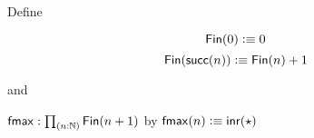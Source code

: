 \documentclass[12pt]{book}
\begin{document}
Define

$$\mathsf{Fin}(0) \vcentcolon\equiv 0$$
$$\mathsf{Fin}(\mathsf{succ}(n)) \vcentcolon\equiv \mathsf{Fin}(n) + 1$$

and

$\fmax : \prd{n:\nat} \Fin(n+1)$ by $\mathsf{fmax}(n) \vcentcolon\equiv {\mathsf{inr}}(\star)$
\end{document}
